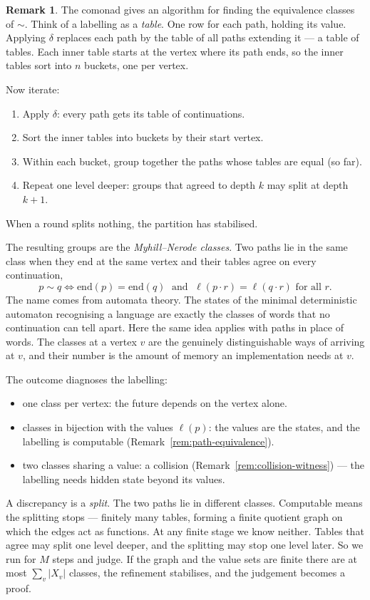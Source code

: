 \documentclass[11pt, a4paper]{article}
\theoremstyle{definition}
\newtheorem{remark}[definition]{Remark}
\theoremstyle{plain}
\begin{document}
\begin{remark}
\label{rem:partition-refinement}
The comonad gives an algorithm for finding the equivalence classes of
$\sim$.  Think of a labelling as a \emph{table}.  One row for each
path, holding its value.  Applying $\delta$ replaces each path by the
table of all paths extending it --- a table of tables.  Each inner
table starts at the vertex where its path ends, so the inner tables
sort into $n$ buckets, one per vertex.

Now iterate:
\begin{enumerate}
  \item Apply $\delta$: every path gets its table of continuations.
  \item Sort the inner tables into buckets by their start vertex.
  \item Within each bucket, group together the paths whose tables are
        equal (so far).
  \item Repeat one level deeper: groups that agreed to depth $k$ may
        split at depth $k+1$.
\end{enumerate}
When a round splits nothing, the partition has stabilised.

The resulting groups are the \emph{Myhill--Nerode classes}.  Two paths
lie in the same class when they end at the same vertex and their
tables agree on every continuation,
\[
  p \sim q
  \iff
  \mathrm{end}(p) = \mathrm{end}(q)
  \;\text{ and }\;
  \ell(p \cdot r) = \ell(q \cdot r) \text{ for all } r.
\]
The name comes from automata theory.  The states of the minimal
deterministic automaton recognising a language are exactly the
classes of words that no continuation can tell apart.  Here the same
idea applies with paths in place of words.  The classes at a vertex
$v$ are the genuinely distinguishable ways of arriving at $v$, and
their number is the amount of memory an implementation needs at $v$.

The outcome diagnoses the labelling:
\begin{itemize}
  \item one class per vertex: the future depends on the vertex alone.
  \item classes in bijection with the values $\ell(p)$: the values
        are the states, and the labelling is computable
        (Remark~\ref{rem:path-equivalence}).
  \item two classes sharing a value: a collision
        (Remark~\ref{rem:collision-witness}) --- the labelling needs
        hidden state beyond its values.
\end{itemize}
A discrepancy is a \emph{split}.  The two paths lie in different
classes.  Computable means the splitting stops --- finitely many
tables, forming a finite quotient graph on which the edges act as
functions.  At any finite stage we know neither.  Tables that agree
may split one level deeper, and the splitting may stop one level
later.  So we run for $M$ steps and judge.  If the graph and the
value sets are finite there are at most $\sum_v |X_v|$ classes, the
refinement stabilises, and the judgement becomes a proof.
\end{remark}
\end{document}
